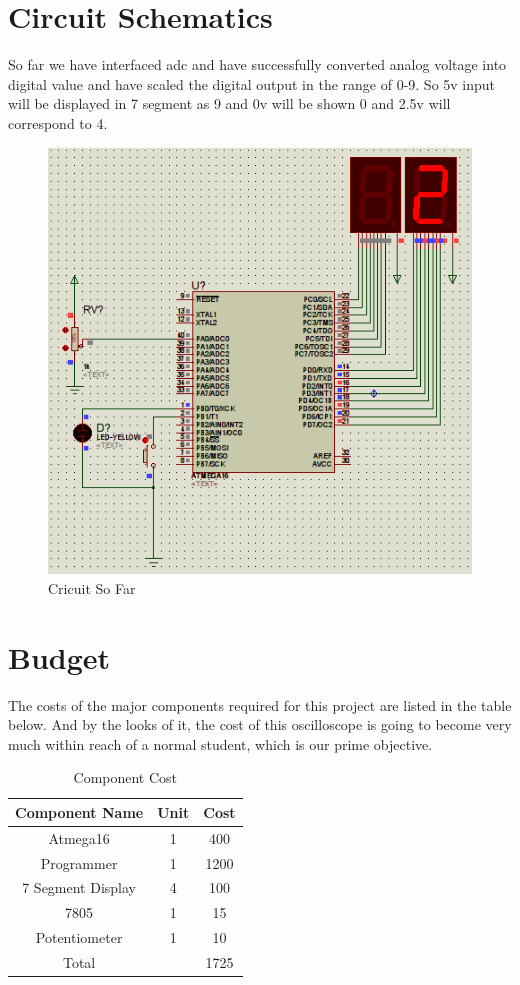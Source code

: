 \documentclass[11pt,a4paper]{article}
\begin{document}
\section{Circuit Schematics}
So far we have interfaced adc and have successfully converted analog voltage into digital value and have scaled the digital output in the range of 0-9. So 5v input will be displayed in 7 segment as 9 and 0v will be shown 0 and 2.5v will correspond to 4. 
\begin{figure}[hbtp]
	\centering
	\includegraphics[scale=.5]{Images/Circuit.png}
	\caption{Cricuit So Far}
\end{figure}
\newpage

\section{Budget}
The costs of the major components required for this project are listed in the table below. And by the looks of it, the cost of this oscilloscope is going to become very much within reach of a normal student, which is our prime objective.
\begin{table}[h]
	\centering
	\begin{tabular}{c c c}
	\textbf{Component Name}  & \textbf{Unit} & \textbf{Cost} \\ 
	\hline
	Atmega16 & 1 & 400 \\ 
	Programmer & 1 & 1200 \\ 	 
	7 Segment Display & 4 & 100 \\ 
	7805 & 1 & 15 \\  
	Potentiometer & 1 & 10 \\  
	Total & {} & 1725 \\
	\end{tabular} 
	\caption{Component Cost}
\end{table}
\end{document}
